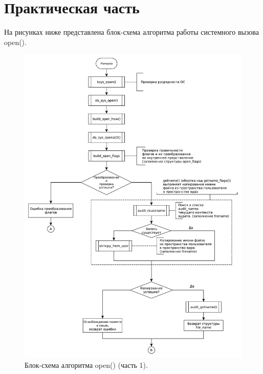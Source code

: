 \chapter{Практическая часть}

На рисунках ниже представлена блок-схема алгоритма работы системного вызова open().

\begin{figure}[H]
    \centering
    \includegraphics[scale=0.6]{data/newpdg/open_1.pdf}
    \caption{Блок-схема алгоритма open() (часть 1).}
\end{figure}

